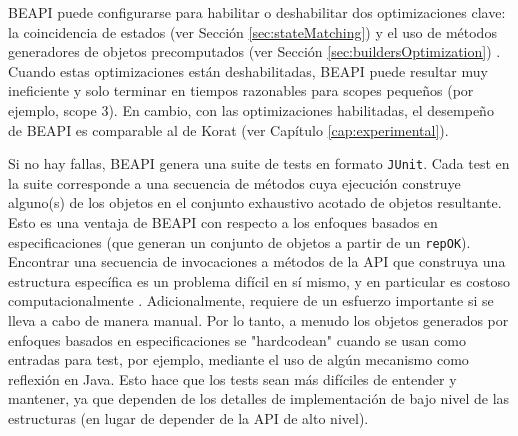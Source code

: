 BEAPI puede configurarse para habilitar o deshabilitar dos optimizaciones clave: 
la coincidencia de estados (ver Sección \ref{sec:stateMatching}) y el uso de métodos generadores de objetos
precomputados (ver Sección \ref{sec:buildersOptimization}) . 
Cuando estas optimizaciones están deshabilitadas, BEAPI puede resultar muy ineficiente 
y solo terminar en tiempos razonables para scopes pequeños (por ejemplo, scope 3). 
En cambio, con las optimizaciones habilitadas, el desempeño de BEAPI es comparable al de Korat (ver Capítulo \ref{cap:experimental}).

Si no hay fallas, BEAPI genera una suite de tests en formato \texttt{JUnit}. 
Cada test en la suite corresponde a una secuencia de métodos cuya ejecución
construye alguno(s) de los objetos en el conjunto exhaustivo acotado de objetos resultante.
Esto es una ventaja de BEAPI con respecto a los enfoques basados en
especificaciones (que generan un conjunto de objetos a partir de un \texttt{repOK}). 
Encontrar una secuencia de invocaciones a métodos de la API que construya una estructura específica es un problema difícil en sí mismo, 
y en particular es costoso computacionalmente \cite{Braione17}. Adicionalmente, requiere
de un esfuerzo importante si se lleva a cabo de manera manual. 
Por lo tanto, a menudo los objetos generados por enfoques basados en
especificaciones se "hardcodean" cuando se usan como entradas para test, por
ejemplo, mediante el uso de algún mecanismo como reflexión en Java. Esto hace
que los tests sean más difíciles de entender y mantener, ya que dependen de los
detalles de implementación de bajo nivel de las estructuras \cite{Braione17} (en
lugar de depender de la API de alto nivel).



